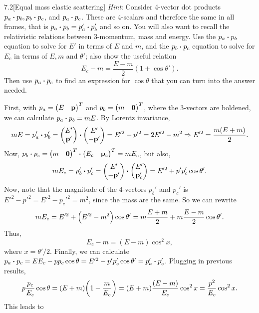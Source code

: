 \documentclass[12pt]{article}
\begin{document}
\begin{problem}{7.2}[Equal mass elastic scattering]
\textit{Hint}: Consider 4-vector dot products $p_a\vdot p_b,p_b\vdot p_c$, and
$p_a\vdot p_c$. These are 4-scalars and therefore the same in all frames, that
is $p_a\vdot p_b=p_a'\vdot p_b'$ and so on. You will also want to recall the
relativistic relations between 3-momentum, mass and energy. Use the $p_a\vdot
p_b$ equation to solve for $E'$ in terms of $E$ and $m$, and the $p_b\vdot p_c$
equation to solve for $E_c$ in terms of $E,m$ and $\theta'$; also show the
useful relation
\begin{equation}
    E_c-m=\frac{E-m}{2}(1+\cos\theta'). 
\end{equation}
Then use $p_a\vdot p_c$ to find an expression for $\cos\theta$ that you can turn
into the answer needed.
\begin{solution}
First, with $p_a=\mqty(E&\vb{p})^T$ and $p_b=\mqty(m&\bm{0})^T$, where the
3-vectors are boldened, we can calculate $p_a\vdot p_b=mE$. By Lorentz
invariance,
\begin{equation}
    mE=p_a'\vdot p_b' 
    =\mqty(E'\\\vb{p}')\vdot\mqty(E'\\-\vb{p}')
    =E'^2+p'^2
    =2E'^2-m^2\Rightarrow
    E'^2=\frac{m(E+m)}{2}.
\end{equation}
Now, $p_b\vdot p_c=\mqty(m&\bm{0})^T\vdot\mqty(E_c&\vb{p}_c)^T=mE_c$, but also,
\begin{equation}
    mE_c=p_b'\vdot p_c'
    =\mqty(E'\\-\vb{p}')\vdot\mqty(E'\\\vb{p}_c')
    =E'^2+p'p_c'\cos\theta'.
\end{equation}
Now, note that the magnitude of the 4-vectors $p_b'$ and $p_c'$ is
$E'^2-p'^2=E'^2-p_c'^2=m^2$, since the mass are the same. So we can rewrite
\begin{equation}
    mE_c=E'^2+\qty(E'^2-m^2)\cos\theta'
    =m\frac{E+m}{2}+m\frac{E-m}{2}\cos\theta'.
\end{equation}
Thus,
\begin{equation}
    E_c-m=(E-m)\cos^2x, 
\end{equation}
where $x=\theta'/2$. Finally, we can calculate $p_a\vdot p_c
=EE_c-pp_c\cos\theta=E'^2-p'p_c'\cos\theta'=p_a'\vdot p_c'$. Plugging in
previous results,
\begin{equation}
    p\frac{p_c}{E_c}\cos\theta=(E+m)\qty(1-\frac{m}{E_c})
    =\qty(E+m)\frac{(E-m)}{E_c}\cos^2x
    =\frac{p^2}{E_c}\cos^2x.
\end{equation}
This leads to
\begin{align}

\end{align}
\end{solution}
\end{problem}
\end{document}
